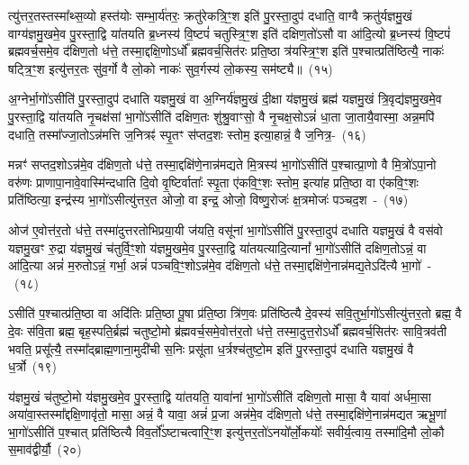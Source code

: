 त्यु॑त्तर॒तस्तस्मा᳚थ्स॒व्यो हस्त॑योः सम्भा॒र्य॑तरः॒ क्रतु॑रेकत्रि॒ꣳ॒श इति॑ पु॒रस्ता॒दुप॑ दधाति॒ वाग्वै क्रतु॑र्यज्ञमु॒खं वाग्य॑ज्ञमु॒खमे॒व पु॒रस्ता॒द्वि या॑तयति ब्र॒ध्नस्य॑ वि॒ष्टपं॑ चतुस्त्रि॒ꣳ॒श इति॑ दक्षिण॒तो॑\-ऽसौ वा आ॑दि॒त्यो ब्र॒ध्नस्य॑ वि॒ष्टपं॑ ब्रह्मवर्च॒समे॒व द॑क्षिण॒तो ध॑त्ते॒ तस्मा॒द्दक्षि॒णो\-ऽर्धो᳚ ब्रह्मवर्च॒सित॑रः प्रति॒ष्ठा त्र॑यस्त्रि॒ꣳ॒श इति॑ प॒श्चात्प्रति॑ष्ठित्यै॒ नाकः॑ षट्त्रि॒ꣳ॒श इत्यु॑त्तर॒तः सु॑व॒र्गो वै लो॒को नाकः॑ सुव॒र्गस्य॑ लो॒कस्य॒ सम॑ष्ट्यै॥~(१५)\ip

{\anuvakamend[{वै त्रि॒वृदिति॑ पु॒रस्ता᳚थ्स॒व्यस्त्र॑योवि॒ꣳ॒श इति॑ सुव॒र्गो वै पञ्च॑ च॥(३) आ॒शुर्व्यो॑म ध॒रुणो॑ भा॒न्तः प्रतू᳚र्तिरभिव॒र्तो वर्च॒स्तपो॒ योनि॒र्गर्भा॒ ओजः॑ स॒म्भर॑णः॒ क्रतु॑र्ब्र॒ध्नस्य॑ प्रति॒ष्ठा नाकः॒ षोड॑श॥}]}%

अ॒ग्नेर्भा॒गो॑\-ऽसीति॑ पु॒रस्ता॒दुप॑ दधाति यज्ञमु॒खं वा अ॒ग्निर्य॑ज्ञमु॒खं दी॒क्षा य॑ज्ञमु॒खं ब्रह्म॑ यज्ञमु॒खं त्रि॒वृद्य॑ज्ञमु॒खमे॒व पु॒रस्ता॒द्वि या॑तयति नृ॒चक्ष॑सां भा॒गो॑\-ऽसीति॑ दक्षिण॒तः शु॑श्रु॒वाꣳसो॒ वै नृ॒चक्ष॒सो\-ऽन्नं॑ धा॒ता जा॒तायै॒वास्मा॒ अन्न॒मपि॑ दधाति॒ तस्मा᳚ज्जा॒तो\-ऽन्न॑मत्ति ज॒नित्रꣴ॑ स्पृ॒तꣳ स॑प्तद॒शः स्तोम॒ इत्या॒हान्नं॒ वै ज॒नित्र॒-~(१६)\ip

मन्नꣳ॑ सप्तद॒शो\-ऽन्न॑मे॒व द॑क्षिण॒तो ध॑त्ते॒ तस्मा॒द्दक्षि॑णे॒नान्न॑मद्यते मि॒त्रस्य॑ भा॒गो॑\-ऽसीति॑ प॒श्चात्प्रा॒णो वै मि॒त्रो॑\-ऽपा॒नो वरु॑णः प्राणापा॒नावे॒वास्मि॑न्दधाति दि॒वो वृ॒ष्टिर्वाताः᳚ स्पृ॒ता ए॑कवि॒ꣳ॒शः स्तोम॒ इत्या॑ह प्रति॒ष्ठा वा ए॑कवि॒ꣳ॒शः प्रति॑ष्ठित्या॒ इन्द्र॑स्य भा॒गो॑\-ऽसीत्यु॑त्तर॒त ओजो॒ वा इन्द्र॒ ओजो॒ विष्णु॒रोजः॑ क्ष॒त्रमोजः॑ पञ्चद॒श~-~(१७)\ip

ओज॑ ए॒वोत्त॑र॒तो ध॑त्ते॒ तस्मा॑दुत्तरतोभिप्रया॒यी ज॑यति॒ वसू॑नां भा॒गो॑\-ऽसीति॑ पु॒रस्ता॒दुप॑ दधाति यज्ञमु॒खं वै वस॑वो यज्ञमु॒खꣳ रु॒द्रा य॑ज्ञमु॒खं च॑तुर्वि॒ꣳ॒शो य॑ज्ञमु॒खमे॒व पु॒रस्ता॒द्वि या॑तयत्यादि॒त्यानां᳚ भा॒गो॑\-ऽसीति॑ दक्षिण॒तो\-ऽन्नं॒ वा आ॑दि॒त्या अन्नं॑ म॒रुतो\-ऽन्नं॒ गर्भा॒ अन्नं॑ पञ्चवि॒ꣳ॒शो\-ऽन्न॑मे॒व द॑क्षिण॒तो ध॑त्ते॒ तस्मा॒द्दक्षि॑णे॒नान्न॑मद्य॒ते\-ऽदि॑त्यै भा॒गो॑~-~(१८)\ip

ऽसीति॑ प॒श्चात्प्र॑ति॒ष्ठा वा अदि॑तिः प्रति॒ष्ठा पू॒षा प्र॑ति॒ष्ठा त्रि॑ण॒वः प्रति॑ष्ठित्यै दे॒वस्य॑ सवि॒तुर्भा॒गो॑\-ऽसीत्यु॑त्तर॒तो ब्रह्म॒ वै दे॒वः स॑वि॒ता ब्रह्म॒ बृह॒स्पति॒र्ब्रह्म॑ चतुष्टो॒मो ब्र॑ह्मवर्च॒समे॒वोत्त॑र॒तो ध॑त्ते॒ तस्मा॒दुत्त॒रो\-ऽर्धो᳚ ब्रह्मवर्च॒सित॑रः सावि॒त्रव॑ती भवति॒ प्रसू᳚त्यै॒ तस्मा᳚द्\-ब्राह्म॒णाना॒मुदी॑ची स॒निः प्रसू॑ता ध॒र्त्रश्च॑तुष्टो॒म इति॑ पु॒रस्ता॒दुप॑ दधाति यज्ञमु॒खं वै ध॒र्त्रो~(१९)\ip

य॑ज्ञमु॒खं च॑तुष्टो॒मो य॑ज्ञमु॒खमे॒व पु॒रस्ता॒द्वि या॑तयति॒ यावा॑नां भा॒गो॑\-ऽसीति॑ दक्षिण॒तो मासा॒ वै यावा॑ अर्धमा॒सा अया॑वा॒स्तस्मा᳚द्\-दक्षि॒णावृ॑तो॒ मासा॒ अन्नं॒ वै यावा॒ अन्नं॑ प्र॒जा अन्न॑मे॒व द॑क्षिण॒तो ध॑त्ते॒ तस्मा॒द्दक्षि॑णे॒नान्न॑मद्यत ऋभू॒णां भा॒गो॑\-ऽसीति॑ प॒श्चात् प्रति॑ष्ठित्यै विव॒र्तो᳚\-ऽष्टाचत्वारि॒ꣳ॒श इत्यु॑त्तर॒तो॑\-ऽनयो᳚र्लो॒कयोः᳚ सवीर्य॒त्वाय॒ तस्मा॑दि॒मौ लो॒कौ स॒माव॑द्वीर्यौ॒~(२०)\ip

